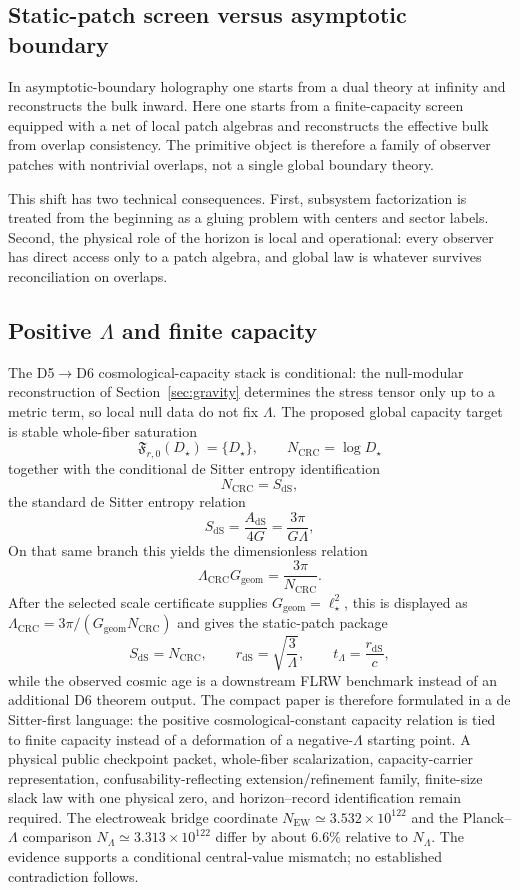 \documentclass[11pt]{article}
\begin{document}
\subsection{Static-patch screen versus asymptotic boundary}

In asymptotic-boundary holography one starts from a dual theory at infinity and reconstructs the bulk inward. Here one starts from a finite-capacity screen equipped with a net of local patch algebras and reconstructs the effective bulk from overlap consistency. The primitive object is therefore a family of observer patches with nontrivial overlaps, not a single global boundary theory.

This shift has two technical consequences. First, subsystem factorization is treated from the beginning as a gluing problem with centers and sector labels. Second, the physical role of the horizon is local and operational: every observer has direct access only to a patch algebra, and global law is whatever survives reconciliation on overlaps.

\subsection{Positive $\Lambda$ and finite capacity}

The D5\(\to\)D6 cosmological-capacity stack is conditional: the null-modular reconstruction of Section~\ref{sec:gravity} determines the stress tensor only up to a metric term, so local null data do not fix $\Lambda$. The proposed global capacity target is stable whole-fiber saturation
\[
\mathfrak F_{r,0}(D_\star)=\{D_\star\},
\qquad N_{\mathrm{CRC}}=\log D_\star
\]
together with the conditional de Sitter entropy identification
\[
N_{\mathrm{CRC}}=S_{\mathrm{dS}},
\]
\noindent the standard de Sitter entropy relation
\[
S_{\mathrm{dS}}=\frac{A_{\mathrm{dS}}}{4G}=\frac{3\pi}{G\Lambda},
\]
On that same branch this yields the dimensionless relation
\[
\Lambda_{\mathrm{CRC}}G_{\mathrm{geom}}=\frac{3\pi}{N_{\mathrm{CRC}}}.
\]
After the selected scale certificate supplies \(G_{\mathrm{geom}}=\ell_\star^2\), this is displayed as
\(\Lambda_{\mathrm{CRC}}=3\pi/(G_{\mathrm{geom}}N_{\mathrm{CRC}})\) and gives the static-patch
package
\[
S_{\mathrm{dS}}=N_{\mathrm{CRC}},
\qquad
r_{\mathrm{dS}}=\sqrt{\frac{3}{\Lambda}},
\qquad
t_\Lambda=\frac{r_{\mathrm{dS}}}{c},
\]
while the observed cosmic age is a downstream FLRW benchmark instead of an additional D6 theorem output. The compact paper is therefore formulated in a de Sitter-first language: the positive cosmological-constant capacity relation is tied to finite capacity instead of a deformation of a negative-$\Lambda$ starting point. A physical public checkpoint packet, whole-fiber scalarization, capacity-carrier representation, confusability-reflecting extension/refinement family, finite-size slack law with one physical zero, and horizon--record identification remain required. The electroweak bridge coordinate \(N_{\mathrm{EW}}\simeq3.532\times10^{122}\) and the Planck--\(\Lambda\) comparison \(N_{\Lambda}\simeq3.313\times10^{122}\) differ by about \(6.6\%\) relative to \(N_{\Lambda}\). The evidence supports a conditional central-value mismatch; no established contradiction follows.
\end{document}
